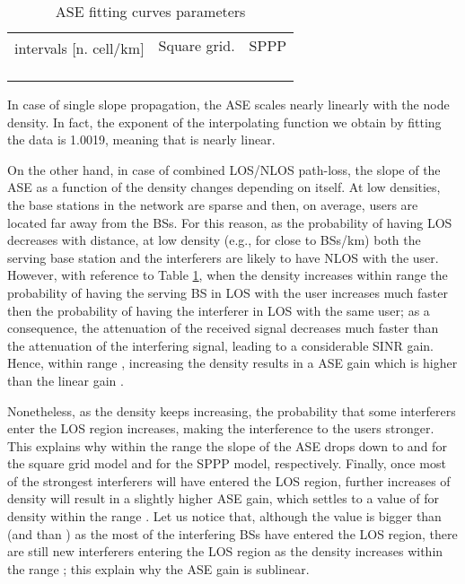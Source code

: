 \documentclass[twocoumn]{IEEEtran}
\begin{document}
\begin{table}[tbph]
\caption{ASE fitting curves parameters}
\label{table:ASEresults}
\centering

\begin{tabular}{|c|c|c|c|c|}
\hline 
\multirow{2}{*}{ intervals [n. cell/km]} & \multicolumn{2}{c|}{Square grid.} & \multicolumn{2}{c|}{SPPP}\tabularnewline
\cline{2-5} 
 &   &   &   &   \tabularnewline
\hline 
  &   &  &  &  \tabularnewline
\hline 
  &  &   &   &  \tabularnewline
\hline 
  &  &  &  &   \tabularnewline
\hline 
\end{tabular}

\end{table}

In case of single slope propagation, the ASE
scales nearly linearly with the node density. In fact, the exponent 
of the interpolating function we obtain by fitting the data is 1.0019,
meaning that  is nearly linear.

On the other hand, in case of combined LOS/NLOS path-loss, the slope of the ASE as a function of the density  changes depending on  itself.
At low densities, the base stations in the network are sparse and then, on average, users are located far away from the BSs. For this reason, as the probability of having LOS decreases with distance, at low density (e.g., for  close to  BSs/km) both the serving base station and the interferers are likely to have NLOS with the user. However, with reference to Table  \ref{table:ASEresults}, when the density increases within range  the probability of having the serving BS in LOS with the user increases much faster then the probability of having the interferer in LOS with the same user; as a consequence, the attenuation of the received signal decreases much faster than the attenuation of the interfering signal, leading to a considerable SINR  gain. Hence, within range , increasing the density results in a ASE gain  which is higher than the linear gain . 

Nonetheless, as the density keeps increasing, the probability that some interferers enter the LOS region increases, making the interference to the users stronger. This explains why within the range  the slope of the ASE drops down to  and  for the square grid model and for the SPPP model, respectively. Finally, once most of the strongest interferers will have entered the LOS region, further increases of density will result in a slightly higher ASE gain, which settles to a value of  for density within the range . Let us notice that, although the value  is bigger than  (and than ) as the most of the interfering BSs have entered the LOS region, there are still new interferers entering the LOS region as the density increases within the range ; this explain why the ASE gain  is sublinear.
\end{document}
